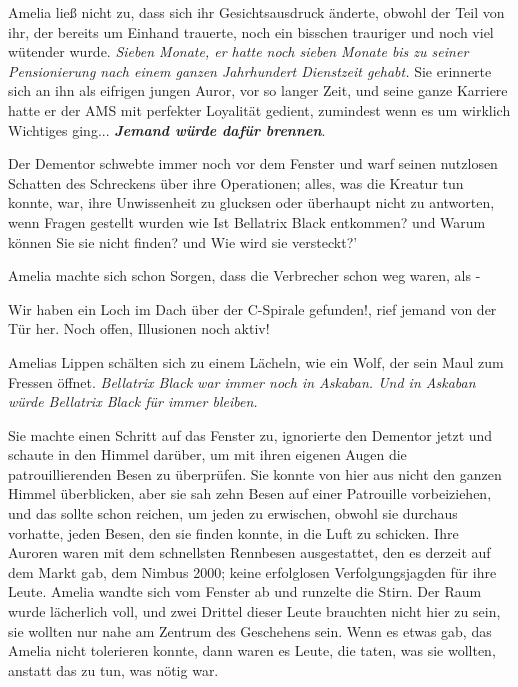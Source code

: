 Amelia ließ nicht zu, dass sich ihr Gesichtsausdruck änderte, obwohl der Teil
von ihr, der bereits um Einhand trauerte, noch ein bisschen trauriger und noch
viel wütender wurde. \emph{Sieben Monate, er hatte noch sieben Monate bis zu
seiner Pensionierung nach einem ganzen Jahrhundert Dienstzeit gehabt.} Sie
erinnerte sich an ihn als eifrigen jungen Auror, vor so langer Zeit, und seine
ganze Karriere hatte er der AMS mit perfekter Loyalität gedient, zumindest wenn
es um wirklich Wichtiges ging... \textbf{\emph{Jemand würde dafür brennen}}.

Der Dementor schwebte immer noch vor dem Fenster und warf seinen nutzlosen
Schatten des Schreckens über ihre Operationen; alles, was die Kreatur tun
konnte, war, ihre Unwissenheit zu glucksen oder überhaupt nicht zu antworten,
wenn Fragen gestellt wurden wie \glqq{}Ist Bellatrix Black entkommen?\grqq{} und
\glqq{}Warum können Sie sie nicht finden?\grqq{} und \glqq{}Wie wird sie
versteckt?'

Amelia machte sich schon Sorgen, dass die Verbrecher schon weg waren, als -

\glqq{}Wir haben ein Loch im Dach über der C-Spirale gefunden!\grqq{}, rief
jemand von der Tür her. \glqq{}Noch offen, Illusionen noch aktiv!\grqq{}

Amelias Lippen schälten sich zu einem Lächeln, wie ein Wolf, der sein Maul zum
Fressen öffnet. \emph{Bellatrix Black war immer noch in Askaban. Und in Askaban
würde Bellatrix Black für immer bleiben.}

Sie machte einen Schritt auf das Fenster zu, ignorierte den Dementor jetzt und
schaute in den Himmel darüber, um mit ihren eigenen Augen die patrouillierenden
Besen zu überprüfen. Sie konnte von hier aus nicht den ganzen Himmel
überblicken, aber sie sah zehn Besen auf einer Patrouille vorbeiziehen, und das
sollte schon reichen, um jeden zu erwischen, obwohl sie durchaus vorhatte, jeden
Besen, den sie finden konnte, in die Luft zu schicken. Ihre Auroren waren mit
dem schnellsten Rennbesen ausgestattet, den es derzeit auf dem Markt gab, dem
Nimbus 2000; keine erfolglosen Verfolgungsjagden für ihre Leute. Amelia wandte
sich vom Fenster ab und runzelte die Stirn. Der Raum wurde lächerlich voll, und
zwei Drittel dieser Leute brauchten nicht hier zu sein, sie wollten nur nahe am
Zentrum des Geschehens sein. Wenn es etwas gab, das Amelia nicht tolerieren
konnte, dann waren es Leute, die taten, was sie wollten, anstatt das zu tun, was
nötig war.

